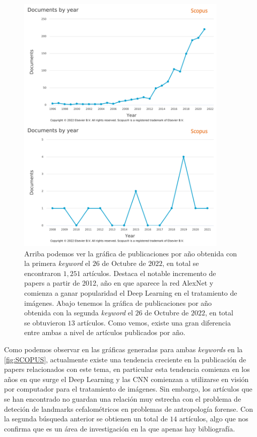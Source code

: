         \begin{figure}[htpb]
            \centering
            \includegraphics[width=0.9\textwidth]{img/SCOPUS_UNIDOS.png}
            \caption{Arriba podemos ver la gráfica de publicaciones por año obtenida con la primera \textit{keyword} el $26$ de Octubre de $2022$, en total se encontraron $1,251$ artículos. Destaca el notable incremento de papers a partir de 2012, año en que aparece la red AlexNet y comienza a ganar popularidad el Deep Learning en el tratamiento de imágenes. Abajo tenemos la gráfica de publicaciones por año obtenida con la segunda \textit{keyword} el $26$ de Octubre de $2022$, en total se obtuvieron $13$ artículos. Como vemos, existe una gran diferencia entre ambas a nivel de artículos publicados por año.}
            \label{fig:SCOPUS}
        \end{figure}
        
        \medskip
        
        \noindent Como podemos observar en las gráficas generadas para ambas \textit{keywords} en la \autoref{fig:SCOPUS}, actualmente existe una tendencia creciente en la publicación de papers relacionados con este tema, en particular esta tendencia comienza en los años en que surge el Deep Learning y las CNN comienzan a utilizarse en visión por computador para el tratamiento de imágenes. Sin embargo, los artículos que se han encontrado no guardan una relación muy estrecha con el problema de deteción de landmarks cefalométricos en problemas de antropología forense. Con la segunda búsqueda anterior se obtienen un total de $14$ artículos, algo que nos confirma que es un área de investigación en la que apenas hay bibliografía.

